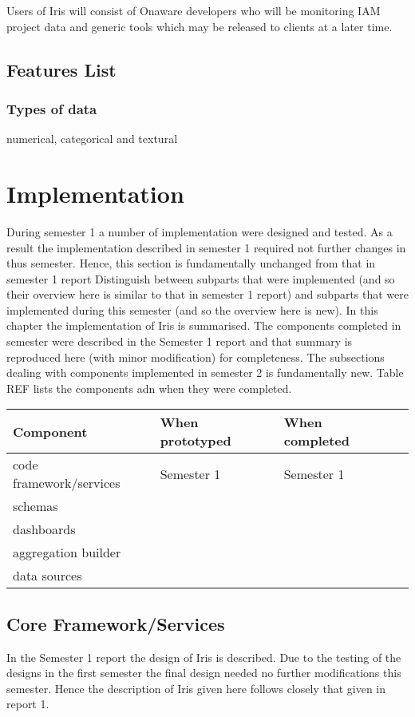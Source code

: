 \documentclass[12pt,a4paper,titlepage]{report}
\begin{document}
Users of Iris will consist of Onaware developers who will be monitoring IAM project data and generic tools which may be released to clients at a later time.

\section{Features List}
\subsection{Types of data}
numerical, categorical and textural

\chapter{Implementation}
During semester 1 a number of implementation were designed and tested. As a result the implementation described in
semester 1 required not further changes in thus semester. Hence, this section is fundamentally unchanged from that in
semester 1 report
Distinguish between subparts that were implemented (and so their overview here is similar to that in semester 1 report) and
subparts that were implemented during this semester (and so the overview here is new).
In this chapter the implementation of Iris is summarised. The components completed in semester were described in the
Semester 1 report and that summary is reproduced here (with minor modification) for completeness. The subsections dealing
with components implemented in semester 2 is fundamentally new. Table REF lists the components adn when they were completed.
\begin{center}
\begin{tabular}{llll}
Component                         & When prototyped  & When completed \\\hline
code framework/services  & Semester 1 & Semester 1 \\
schemas &\\
dashboards &\\
aggregation builder  &\\
data sources & \\
\end{tabular}
\end{center}

\section{Core Framework/Services}
In the Semester 1 report the design of Iris is described. Due to the testing of the designs in the first semester the final design needed no further modifications this semester. Hence the description of Iris given here follows closely that given in report 1.
\end{document}

